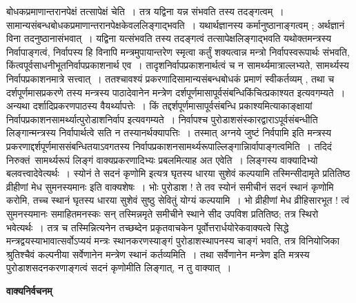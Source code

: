 \documentclass[11pt, openany]{book}
\makeatletter
\def\blfootnote{\gdef\@thefnmark{}\@footnotetext}
\makeatother
\begin{document}
\noindent
बोधकप्रमाणान्तरानपेक्षं तत्सापेक्षं चेति~। तत्र यद्विना यन्न संभवति तस्य तदङ्गत्वम्~। सामान्यसंबन्धबोधकप्रमाणान्तरानपेक्षकेवललिङ्गाद्भवति~। यथार्थज्ञानस्य कर्मानुष्ठानाङ्गत्वम् ; अर्थज्ञानं विना तदनुष्ठानासंभवात्~। यद्विना यत्संभवति तस्य तदङ्गत्वं तत्सापेक्षलिङ्गाद्भवति यथोक्तमन्त्रस्य निर्वापाङ्गत्वं, निर्वापस्य हि विनापि मन्त्रमुपायान्तरेण स्मृत्वा कर्तुं शक्यत्वान्न मन्त्रो निर्वापस्वरूपार्थः संभवति, किंत्वपूर्वसाधनीभूतनिर्वापप्रकाशनार्थ एव~। तादृशनिर्वापप्रकाशनार्थत्वं च न सामर्थ्यमात्राल्लभ्यते, सामर्थ्यस्य निर्वापप्रकाशनमात्रे सत्त्वात्~। ततश्चावश्यं  प्रकरणादिसामान्यसंबन्धबोधकं प्रमाणं स्वीकर्तव्यम् , तथा च दर्शपूर्णमासप्रकरणे तस्य मन्त्रस्य पाठादेवानेन मन्त्रेण
दर्शपूर्णमासापूर्वसंबन्धिकिंचित्प्रकाश्यत इत्यवगम्यते~। अन्यथा दर्शादिप्रकरणपाठस्य वैयर्थ्यापत्तेः~। किं तद्दर्शपूर्णमासापूर्वसंबन्धि प्रकाश्यमित्याकाङ्क्षायां निर्वापप्रकाशनसामर्थ्यात्पुरोडाशनिर्वाप इत्यवगम्यते~। निर्वापश्च पुरोडाशसंस्कारद्वाराऽपूर्वसंबन्धीति लिङ्गान्मन्त्रस्य निर्वापार्थत्वे सति न तस्यानर्थक्यापत्तिः~। तस्मात्
{\qt अग्नये जुष्टं निर्वपामि} इति मन्त्रस्य प्रकरणाद्दर्शपूर्णमाससंबन्धितयाऽवगतस्य निर्वापप्रकाशनसामर्थ्यरूपाल्लिङ्गान्निार्वापाङ्गत्वमिति~। तदिदं निरुक्तं\footnotemark\ सामर्थ्यरूपं लिङ्गं वाक्यप्रकरणादिभ्यः प्रबलमित्याह {\br अत एवेति~।} लिङ्गस्य वाक्यादिभ्यो बलवत्त्वादेवेत्यर्थः~। {\qt स्योनं ते सदनं कृणोमि} इत्यत्र {\qt घृतस्य धारया सुशेवं कल्पयामि तस्मिन्सीदामृते प्रतितिष्ठ व्रीहीणां मेध सुमनस्यमानः} इति वाक्यशेषः~। भोः पुरोडाश ! ते तव स्योनं समीचीनं सदनं स्थानं कृणोमि करोमि, तच्च स्थानं घृतस्य धारया सुशेवं सुष्ठु सेवितुं योग्यं कल्पयामि~। भो व्रीहीणां मेध व्रीहिसारभूत ! त्वं सुमनस्यमानः समाहितमनस्कः सन् तस्मिन्नमृते समीचीने स्थाने सीद उपविश प्रतितिष्ठ; तत्र स्थिरो भवेत्यर्थः~। तत्र च तस्मिन्नित्यनेन तच्छब्देन प्रकृतवाचकेन पूर्वोत्तरार्धयोरेकवाक्यत्वे सिद्धे  मन्त्रद्वयस्याभावात्सर्वोऽप्ययं
मन्त्रः स्थानकरणस्याङ्गं पुरोडाशस्थापनस्य चाङ्गं भवति, तत्र विनियोजिका श्रुतिश्चैवं कल्पनीया सर्वेणानेन मन्त्रेण स्थानं कर्तव्यमिति~। तथा सर्वेणानेन मन्त्रेण
\blfootnote{टिप्प०\textemdash\ $^{1}$निरनुस्वारः पाठः सम्यगिति प्रतीयते~।}
\newpage
\fancyhead[RE]{[ वाक्यनिर्वचनम् ]}
{\bl{} इति मत्रस्य पुरोडाशसदनकरणाङ्गत्वं सदनं कृणोमीति लिङ्गात्, न तु वाक्यात्~।}
\begin{center}
 \textbf{वाक्यनिर्वचनम्}   
\end{center}
 
\end{document}
